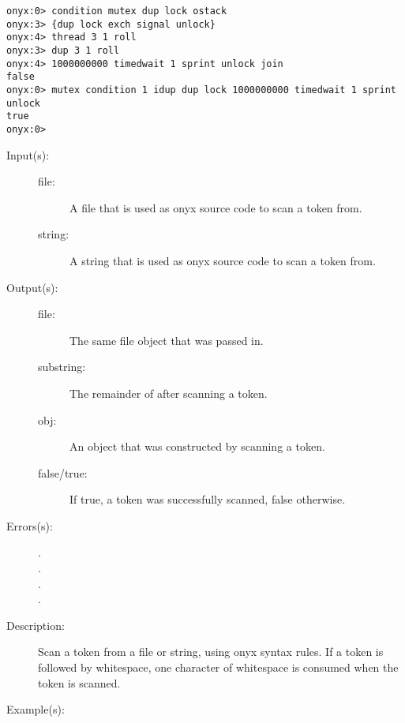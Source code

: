 \begin{description}
\begin{description}
\begin{verbatim}
onyx:0> condition mutex dup lock ostack
onyx:3> {dup lock exch signal unlock}
onyx:4> thread 3 1 roll
onyx:3> dup 3 1 roll
onyx:4> 1000000000 timedwait 1 sprint unlock join
false
onyx:0> mutex condition 1 idup dup lock 1000000000 timedwait 1 sprint unlock
true
onyx:0>
		\end{verbatim}
	\end{description}
\label{systemdict:token}
\item[{\onyxop{file/string}{token}{false}}: ]
\item[{\onyxop{file/string}{token}{file/substring obj true}}: ]
	\begin{description}\item[]
	\item[Input(s): ]
		\begin{description}\item[]
		\item[file: ]
			A file that is used as onyx source code to scan a token
			from.
		\item[string: ]
			A string that is used as onyx source code to scan a
			token from.
		\end{description}
	\item[Output(s): ]
		\begin{description}\item[]
		\item[file: ]
			The same file object that was passed in.
		\item[substring: ]
			The remainder of  after scanning a token.
		\item[obj: ]
			An object that was constructed by scanning a token.
		\item[false/true: ]
			If true, a token was successfully scanned, false
			otherwise.
		\end{description}
	\item[Errors(s): ]
		\begin{description}\item[]
		\item[.]
		\item[.]
		\item[.]
		\item[.]
		\end{description}
	\item[Description: ]
		Scan a token from a file or string, using onyx syntax rules.  If
		a token is followed by whitespace, one character of whitespace
		is consumed when the token is scanned.
	\item[Example(s): ]\begin{verbatim}


\end{verbatim}
\end{description}
\end{description}
